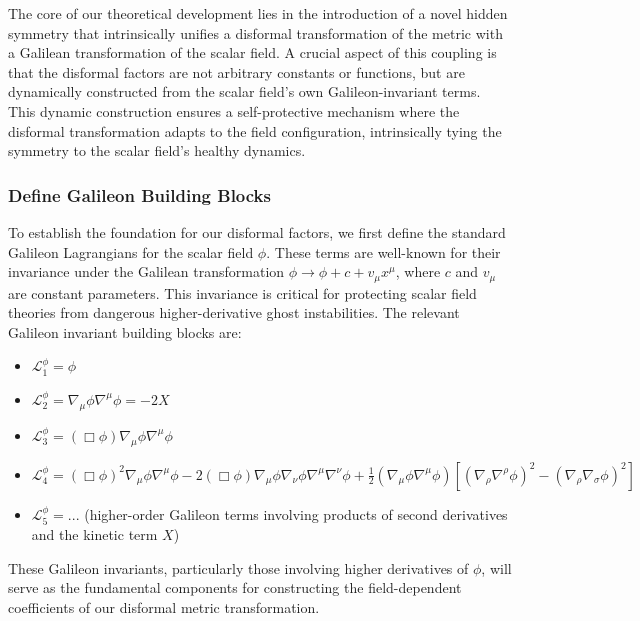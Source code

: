 \documentclass[twocolumn]{aastex631}
\begin{document}
The core of our theoretical development lies in the introduction of a novel hidden symmetry that intrinsically unifies a disformal transformation of the metric with a Galilean transformation of the scalar field. A crucial aspect of this coupling is that the disformal factors are not arbitrary constants or functions, but are dynamically constructed from the scalar field's own Galileon-invariant terms. This dynamic construction ensures a self-protective mechanism where the disformal transformation adapts to the field configuration, intrinsically tying the symmetry to the scalar field's healthy dynamics.

\subsubsection{Define Galileon Building Blocks}
To establish the foundation for our disformal factors, we first define the standard Galileon Lagrangians for the scalar field $\phi$. These terms are well-known for their invariance under the Galilean transformation $\phi \rightarrow \phi + c + v_\mu x^\mu$, where $c$ and $v_\mu$ are constant parameters. This invariance is critical for protecting scalar field theories from dangerous higher-derivative ghost instabilities. The relevant Galileon invariant building blocks are:
\begin{itemize}
    \item $\mathcal{L}_1^\phi = \phi$
    \item $\mathcal{L}_2^\phi = \nabla_\mu \phi \nabla^\mu \phi = -2X$
    \item $\mathcal{L}_3^\phi = (\Box \phi) \nabla_\mu \phi \nabla^\mu \phi$
    \item $\mathcal{L}_4^\phi = (\Box\phi)^2 \nabla_\mu \phi \nabla^\mu \phi - 2(\Box\phi) \nabla_\mu \phi \nabla_\nu \phi \nabla^\mu \nabla^\nu \phi + \frac{1}{2} (\nabla_\mu \phi \nabla^\mu \phi) [(\nabla_\rho \nabla^\rho \phi)^2 - (\nabla_\rho \nabla_\sigma \phi)^2]$
    \item $\mathcal{L}_5^\phi = ...$ (higher-order Galileon terms involving products of second derivatives and the kinetic term $X$)
\end{itemize}
These Galileon invariants, particularly those involving higher derivatives of $\phi$, will serve as the fundamental components for constructing the field-dependent coefficients of our disformal metric transformation.
\end{document}
